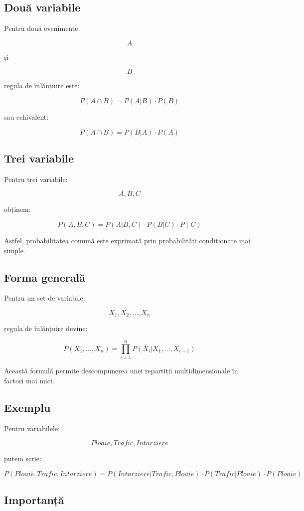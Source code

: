 \documentclass[12pt,a4paper]{article}
\begin{document}
\subsection{Două variabile}

Pentru două evenimente:

\[
A
\]

și

\[
B
\]

regula de înlănțuire este:

\[
P(A \cap B)
=
P(A|B)\cdot P(B)
\]

sau echivalent:

\[
P(A \cap B)
=
P(B|A)\cdot P(A)
\]

\subsection{Trei variabile}

Pentru trei variabile:

\[
A,B,C
\]

obținem:

\[
P(A,B,C)
=
P(A|B,C)
\cdot
P(B|C)
\cdot
P(C)
\]

Astfel, probabilitatea comună este exprimată prin probabilități condiționate mai simple.

\subsection{Forma generală}

Pentru un set de variabile:

\[
X_1,X_2,\dots,X_n
\]

regula de înlănțuire devine:

\[
P(X_1,\dots,X_n)
=
\prod_{i=1}^{n}
P(X_i|X_1,\dots,X_{i-1})
\]

Această formulă permite descompunerea unei repartiții multidimensionale în factori mai mici.

\subsection{Exemplu}

Pentru variabilele:

\[
Ploaie,
Trafic,
Intarziere
\]

putem scrie:

\[
P(Ploaie,
Trafic,
Intarziere)
=
P(Intarziere|Trafic,Ploaie)
\cdot
P(Trafic|Ploaie)
\cdot
P(Ploaie)
\]

\subsection{Importanță}
\end{document}
